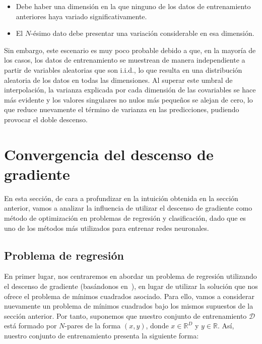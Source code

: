 \begin{itemize}
    \item Debe haber una dimensión en la que ninguno de los datos de entrenamiento anteriores haya variado significativamente.
    \item El $N$-ésimo dato debe presentar una variación considerable en esa dimensión.\newline
\end{itemize}

Sin embargo, este escenario es muy poco probable debido a que, en la mayoría de los casos, los datos de entrenamiento se muestrean de manera independiente a partir de variables aleatorias que son i.i.d., lo que resulta en una distribución aleatoria de los datos en todas las dimensiones. Al superar este umbral de interpolación, la varianza explicada por cada dimensión de las covariables se hace más evidente y los valores singulares no nulos más pequeños se alejan de cero, lo que reduce nuevamente el término de varianza en las predicciones, pudiendo provocar el doble descenso.\newline

\section{Convergencia del descenso de gradiente}\label{sec:sesgo-implicito-descenso-gradiente}

En esta sección, de cara a profundizar en la intuición obtenida en la sección anterior, vamos a analizar la influencia de utilizar el descenso de gradiente como método de optimización en problemas de regresión y clasificación, dado que es uno de los métodos más utilizados para entrenar redes neuronales.

\subsection{Problema de regresión}\label{subsec:problema-regresion}
En primer lugar, nos centraremos en abordar un problema de regresión utilizando el descenso de gradiente (basándonos en~\cite{Lafon2024}), en lugar de utilizar la solución que nos ofrece el problema de mínimos cuadrados asociado. Para ello, vamos a considerar nuevamente un problema de mínimos cuadrados bajo los mismos supuestos de la sección anterior. Por tanto, suponemos que nuestro conjunto de entrenamiento $\mathcal{D}$ está formado por $N$-pares de la forma $(x, y)$, donde $x \in \mathbb{R}^{D}$ y $y \in \mathbb{R}$. Así, nuestro conjunto de entrenamiento presenta la siguiente forma:

